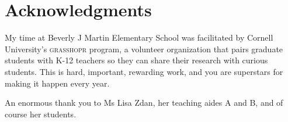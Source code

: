 \documentclass[sigplan,review]{acmart}
\begin{document}
\section*{Acknowledgments}

My time at Beverly J Martin Elementary School was facilitated by Cornell University's \textsc{grasshopr} program, a volunteer organization that pairs graduate students with K-12 teachers so they can share their research with curious students.
This is hard, important, rewarding work, and you are superstars for making it happen every year.

An enormous thank you to Ms Lisa Zdan, her teaching aides A and B, and of course her students.

\appendix



\end{document}
